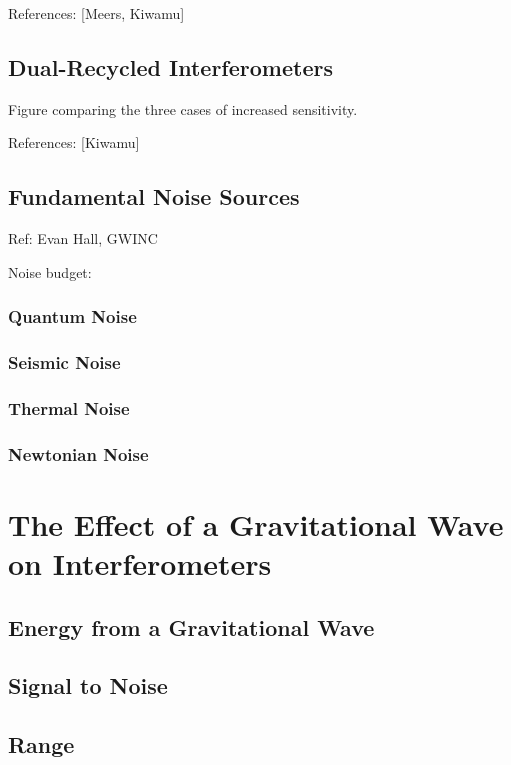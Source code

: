 \documentclass[oneside]{book}
\begin{document}
		References: [Meers, Kiwamu]
		
		\subsection{Dual-Recycled Interferometers}
		
		
		Figure comparing the three cases of increased sensitivity.
		
		References: [Kiwamu]
		
		\subsection{Fundamental Noise Sources}
		Ref: Evan Hall, GWINC

		Noise budget:

		\subsubsection{Quantum Noise}
		\subsubsection{Seismic Noise}
		\subsubsection{Thermal Noise}
		\subsubsection{Newtonian Noise}

	
	\section{The Effect of a Gravitational Wave on Interferometers}
	
		\subsection{Energy from a Gravitational Wave}
		
		\subsection{Signal to Noise}
		
		\subsection{Range}
	
\end{document}
